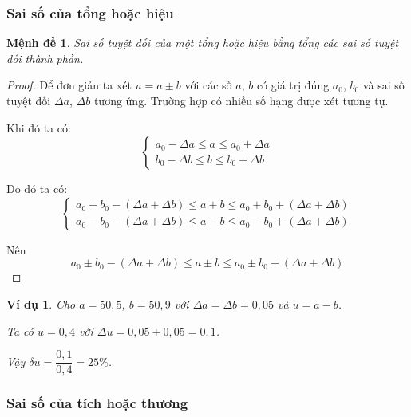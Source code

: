 \documentclass{book}    %
\newtheorem{exmp}{Ví dụ}[chapter]
\newtheorem*{proposition}{Mệnh đề}
\begin{document}
\subsubsection{Sai số của tổng hoặc hiệu}

\begin{proposition} \label{prop:error_of_sum}
    Sai số tuyệt đối của một tổng hoặc hiệu bằng tổng các sai số tuyệt đối thành
    phần.
\end{proposition}
\begin{proof}
    Để đơn giản ta xét \(u = a \pm b\) với các số \(a\), \(b\) có giá trị đúng
    \(a_0\), \(b_0\) và sai số tuyệt đối \(\Delta a\), \(\Delta b\) tương ứng.
    Trường hợp có nhiều số hạng được xét tương tự.

    Khi đó ta có:
    \begin{equation*}
        \begin{cases}
            a_0 - \Delta a \leq a \leq a_0 + \Delta a \\
            b_0 - \Delta b \leq b \leq b_0 + \Delta b
        \end{cases}
    \end{equation*}

    Do đó ta có:
    \begin{equation*}
        \begin{cases}
            a_0 + b_0 - (\Delta a + \Delta b) \leq a + b \leq a_0 + b_0 + (\Delta a + \Delta b) \\
            a_0 - b_0 - (\Delta a + \Delta b) \leq a - b \leq a_0 - b_0 + (\Delta a + \Delta b)
        \end{cases}
    \end{equation*}

    Nên
    \begin{equation*}
        a_0 \pm b_0 - (\Delta a + \Delta b) \leq a \pm b \leq a_0 \pm b_0 + (\Delta a + \Delta b)
    \end{equation*}
\end{proof}

\begin{exmp}
    Cho \(a = 50,5\), \(b = 50,9\) với \(\Delta a = \Delta b = 0,05\) và \(u = a - b\).

    Ta có \(u = 0,4\) với \(\Delta u = 0,05 + 0,05 = 0,1\).

    Vậy \(\delta u = \dfrac{0,1}{0,4} = 25\%\).
\end{exmp}

\subsubsection{Sai số của tích hoặc thương}
\end{document}

